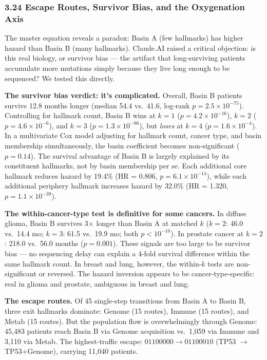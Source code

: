 \documentclass[
  11pt,
]{article}
\begin{document}
\subsubsection{3.24 Escape Routes, Survivor Bias, and the Oxygenation
Axis}\label{escape-routes-survivor-bias-and-the-oxygenation-axis}

The master equation reveals a paradox: Basin A (few hallmarks) has
higher hazard than Basin B (many hallmarks). Claude.AI raised a critical
objection: is this real biology, or survivor bias --- the artifact that
long-surviving patients accumulate more mutations simply because they
live long enough to be sequenced? We tested this directly.

\textbf{The survivor bias verdict: it's complicated.} Overall, Basin B
patients survive 12.8 months longer (median 54.4 vs.~41.6, log-rank
\(p = 2.5 \times 10^{-75}\)). Controlling for hallmark count, Basin B
wins at \(k = 1\) (\(p = 4.2 \times 10^{-16}\)), \(k = 2\)
(\(p = 4.6 \times 10^{-6}\)), and \(k = 3\)
(\(p = 1.3 \times 10^{-86}\)), but \emph{loses} at \(k = 4\)
(\(p = 1.6 \times 10^{-4}\)). In a multivariate Cox model adjusting for
hallmark count, cancer type, and basin membership simultaneously, the
basin coefficient becomes non-significant (\(p = 0.14\)). The survival
advantage of Basin B is largely explained by its constituent hallmarks,
not by basin membership per se. Each additional core hallmark reduces
hazard by 19.4\% (HR = 0.806, \(p = 6.1 \times 10^{-14}\)), while each
additional periphery hallmark increases hazard by 32.0\% (HR = 1.320,
\(p = 1.1 \times 10^{-39}\)).

\textbf{The within-cancer-type test is definitive for some cancers.} In
diffuse glioma, Basin B survives 3\(\times\) longer than Basin A at
matched \(k\) (\(k = 2\): 46.0 vs.~14.4 mo; \(k = 3\): 61.5 vs.~19.9 mo;
both \(p < 10^{-10}\)). In prostate cancer at \(k = 2\): 218.0 vs.~56.0
months (\(p = 0.001\)). These signals are too large to be survivor bias
--- no sequencing delay can explain a 4-fold survival difference within
the same hallmark count. In breast and lung, however, the within-\(k\)
tests are non-significant or reversed. The hazard inversion appears to
be cancer-type-specific: real in glioma and prostate, ambiguous in
breast and lung.

\textbf{The escape routes.} Of 45 single-step transitions from Basin A
to Basin B, three exit hallmarks dominate: Genome (15 routes), Immune
(15 routes), and Metab (15 routes). But the population flow is
overwhelmingly through Genome: 45,483 patients reach Basin B via Genome
acquisition vs.~1,059 via Immune and 3,110 via Metab. The
highest-traffic escape: \(01100000 \to 01100010\) (TP53 \(\to\)
TP53+Genome), carrying 11,040 patients.
\end{document}
